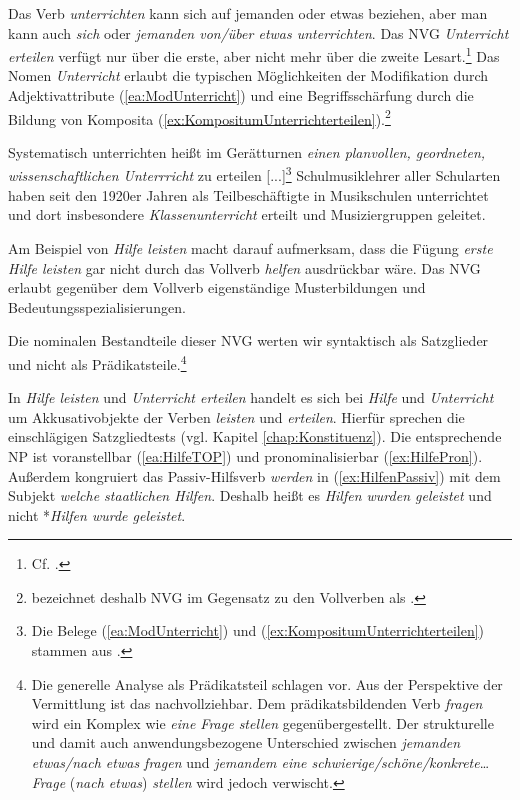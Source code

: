 Das Verb \textit{unterrichten} kann sich auf jemanden oder etwas beziehen, aber man kann auch \textit{sich} oder \textit{jemanden von/über etwas unterrichten}. Das NVG \textit{Unterricht erteilen} verfügt nur über die erste, aber nicht mehr über die zweite Lesart.\footnote{Cf. \citet[159]{Storrer2006}.} Das Nomen \textit{Unterricht} erlaubt die typischen Möglichkeiten der Modifikation \ua durch Adjektivattribute (\ref{ea:ModUnterricht}) und eine Begriffsschärfung durch die Bildung von Komposita (\ref{ex:KompositumUnterrichterteilen}).\footnote{\citet[166]{Storrer2006} bezeichnet deshalb NVG im Gegensatz zu den Vollverben als .}

\ea \label{ea:Unterrichterteilen}
\ea \label{ea:ModUnterricht} Systematisch unterrichten heißt im Gerätturnen \textit{einen planvollen, geordneten, wissenschaftlichen Unterrricht} zu erteilen [...]\footnote{Die Belege (\ref{ea:ModUnterricht}) und (\ref{ex:KompositumUnterrichterteilen}) stammen aus \citet[166]{Storrer2006}.}
\ex \label{ex:KompositumUnterrichterteilen} Schulmusiklehrer aller Schularten haben seit den 1920er Jahren als Teilbeschäftigte
in Musikschulen unterrichtet und dort insbesondere \textit{Klassenunterricht} erteilt und Musiziergruppen geleitet.
\z 
\z 

Am Beispiel von \textit{Hilfe leisten} macht \citet[162]{Storrer2006} darauf aufmerksam, dass die Fügung \textit{erste Hilfe leisten} gar nicht durch das Vollverb \textit{helfen} ausdrückbar wäre. Das NVG erlaubt gegenüber dem Vollverb eigenständige Musterbildungen und Bedeutungsspezialisierungen. 

Die nominalen Bestandteile dieser NVG werten wir syntaktisch als Satzglieder und nicht als Prädikatsteile.\footnote{Die generelle Analyse als Prädikatsteil schlagen \citet[68]{HelbigBuscha} vor. Aus der Perspektive der Vermittlung ist das nachvollziehbar. Dem prädikatsbildenden Verb \textit{fragen} wird ein Komplex wie \textit{eine Frage stellen} gegenübergestellt. Der strukturelle und damit auch anwendungsbezogene Unterschied zwischen \textit{jemanden etwas/nach etwas fragen} und \textit{jemandem eine schwierige/schöne/konkrete}\ldots{} \textit{Frage} (\textit{nach etwas}) \textit{stellen} wird jedoch verwischt.} 

In \textit{Hilfe leisten} und \textit{Unterricht erteilen} handelt es sich bei \textit{Hilfe} und \textit{Unterricht} um Akkusativobjekte der Verben \textit{leisten} und \textit{erteilen}. Hierfür sprechen die einschlägigen Satzgliedtests (vgl. Kapitel \ref{chap:Konstituenz}). Die entsprechende NP ist voranstellbar (\ref{ea:HilfeTOP}) und pronominalisierbar (\ref{ex:HilfePron}). Außerdem kongruiert das Passiv-Hilfsverb \textit{werden} in (\ref{ex:HilfenPassiv}) mit dem Subjekt \textit{welche staatlichen Hilfen}. Deshalb heißt es \textit{Hilfen wurden geleistet} und nicht *\textit{Hilfen wurde geleistet}. 

